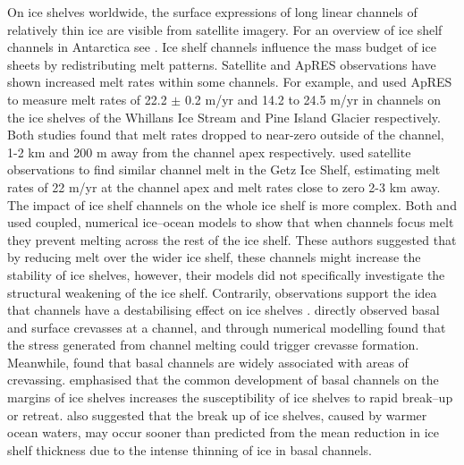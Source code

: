 On ice shelves worldwide, the surface expressions of long linear channels of relatively thin ice are visible from satellite imagery. For an overview of ice shelf channels in Antarctica see \cite{alley2016impacts}.
Ice shelf channels influence the mass budget of ice sheets by redistributing melt patterns. Satellite and ApRES observations have shown increased melt rates within some channels. For example, \cite {marsh2016high} and \cite{stanton2013channelized}  used ApRES to measure melt rates of 22.2 $\pm$ 0.2 m/yr and 14.2 to 24.5 m/yr in channels on the ice shelves of the Whillans Ice Stream and Pine Island Glacier respectively. Both studies found that melt rates dropped to near-zero outside of the channel, 1-2 km and 200 m away from the channel apex respectively. \cite{chartrand2020basal} used satellite observations to find similar channel melt in the  Getz Ice Shelf, estimating melt rates of 22 m/yr at the channel apex and melt rates close to zero 2-3 km away.
The impact of ice shelf channels on the whole ice shelf is more complex. Both \cite{gladish2012ice} and \cite{millgate2013effect} used coupled, numerical ice--ocean models to show that when channels focus melt they prevent melting across the rest of the ice shelf.  These authors suggested that by reducing melt over the wider ice shelf, these channels might increase the stability of ice shelves, however, their models did not specifically investigate the structural weakening of the ice shelf. Contrarily, observations support the idea that channels have a destabilising effect on ice shelves \cite [e.g.][] {alley2016impacts}. \cite{vaughan2012subglacial} directly observed basal and surface crevasses at a channel, and through numerical modelling found that the stress generated from channel melting could trigger crevasse formation.
Meanwhile, \cite{alley2016impacts} found that basal channels are widely associated with areas of crevassing. \cite{alley2019troughs} emphasised that the common development of basal channels on the margins of ice shelves increases the susceptibility of ice shelves to rapid break--up or retreat.
\cite{rignot2008recent} also suggested that the  break up of ice shelves, caused by warmer ocean waters, may occur sooner than predicted from the mean reduction in ice shelf thickness due to the intense thinning of ice in basal channels.

